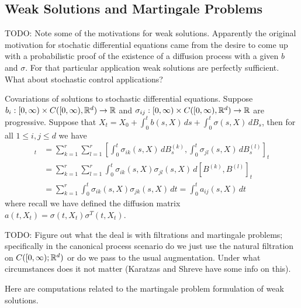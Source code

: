 \subsection{Weak Solutions and Martingale Problems}

TODO: Note some of the motivations for weak solutions.  Apparently the original motivation for stochatic differential equations came from the desire to come up with a probabilistic proof of the existence of a diffusion process with a given $b$ and $\sigma$.  For that particular application weak solutions are perfectly sufficient.  What about stochastic control applications?

Covariations of solutions to stochastic differential equations.  Suppose $b_i : [0,\infty) \times C([0,\infty), \mathbb{R}^d) \to \mathbb{R}$ and $\sigma_{ij} : [0,\infty) \times C([0,\infty), \mathbb{R}^d) \to \mathbb{R}$ are progressive.  Suppose that $X_t = X_0 + \int_0^t b(s,X) \, ds + \int_0^t \sigma(s,X) \, dB_s$, then for all $1 \leq i,j \leq d$ we have
\begin{align*}
[X^{(i)}, X^{(j)}]_t &= \sum_{k=1}^r \sum_{l=1}^r [\int_0^t \sigma_{ik}(s,X) \, dB^{(k)}_s, \int_0^t \sigma_{jl}(s,X) \, dB^{(l)}_s]_t \\
&=\sum_{k=1}^r \sum_{l=1}^r \int_0^t \sigma_{ik}(s,X) \sigma_{jl}(s,X)  \, d[ B^{(k)}, B^{(l)}]_t \\
&=\sum_{k=1}^r \int_0^t \sigma_{ik}(s,X) \sigma_{jk}(s,X)  \, dt
=\int_0^t a_{ij}(s,X)  \, dt
\end{align*}
where recall we have defined the diffusion matrix $a(t,X_t) = \sigma(t,X_t) \sigma^T(t,X_t)$. 

TODO: Figure out what the deal is with filtrations and martingale problems; specifically in the canonical process scenario do we just use the natural filtration on $C([0,\infty); \mathbb{R}^d)$ or do we pass to the usual augmentation.  Under what circumstances does it not matter (Karatzas and Shreve have some info on this).

Here are computations related to the martingale problem formulation of weak solutions.

